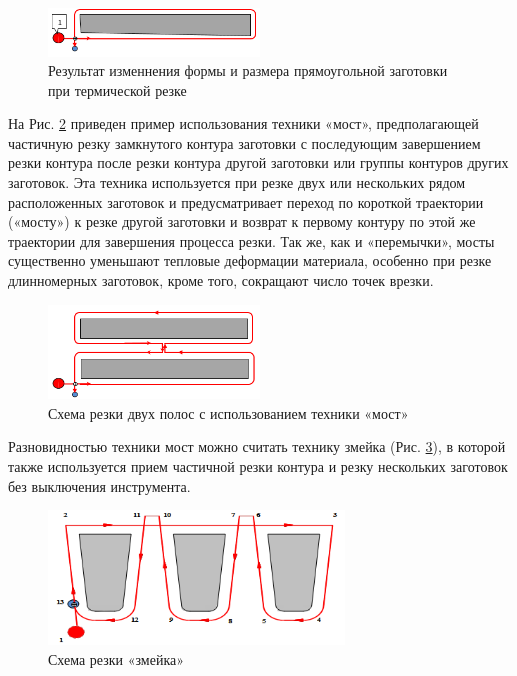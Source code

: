 \documentclass{article}
\begin{document}
\begin{figure}
  \begin{center}
  \includegraphics[width=0.5\textwidth]{saber.png}
  \caption{Результат изменнения формы и размера прямоугольной заготовки при термической резке}
  \label{saber}
  \end{center}
\end{figure}

На Рис. \ref{bridge}
приведен пример использования техники «мост»,
предполагающей  частичную резку замкнутого контура
заготовки с последующим завершением резки контура
после резки контура другой заготовки или
группы контуров других заготовок.
Эта техника используется при резке двух или
нескольких рядом расположенных заготовок и
предусматривает переход по короткой траектории («мосту»)
к резке другой заготовки и возврат к первому контуру
по этой же траектории для завершения процесса резки.
Так же, как и «перемычки»,
мосты существенно уменьшают тепловые деформации материала,
особенно при резке длинномерных заготовок,
кроме того, сокращают число точек врезки.

\begin{figure}
  \begin{center}
  \includegraphics[width=0.5\textwidth]{bridge.png}
  \caption{Схема резки двух полос с использованием техники «мост»}
  \label{bridge}
  \end{center}
\end{figure}

Разновидностью техники мост можно считать технику змейка
(Рис. \ref{snake}),
в которой также используется прием
частичной резки контура и резку
нескольких заготовок без выключения инструмента.

\begin{figure}
  \begin{center}
  \includegraphics[width=0.7\textwidth]{snake.png}
  \caption{Схема резки «змейка»}
  \label{snake}
  \end{center}
\end{figure}
\end{document}
